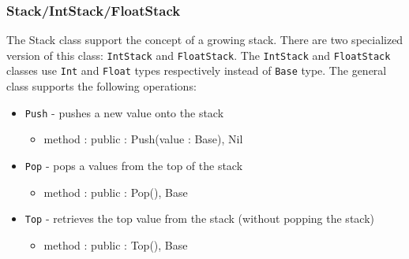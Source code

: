 \documentclass[12pt]{article}
\begin{document}
\subsubsection{Stack/IntStack/FloatStack}
The Stack class support the concept of a growing stack.  There are two specialized version of this class: \texttt{IntStack} and \texttt{FloatStack}.  The \texttt{IntStack} and \texttt{FloatStack} classes use \texttt{Int} and \texttt{Float} types respectively instead of \texttt{Base} type.  The general class supports the following operations:
\begin{itemize}
    \item \texttt{Push} - pushes a new value onto the stack
    	\begin{itemize}
	\item method : public : Push(value : Base), Nil
	\end{itemize}
    \item \texttt{Pop} - pops a values from the top of the stack
    	\begin{itemize}
	\item method : public : Pop(), Base
	\end{itemize}
    \item \texttt{Top} - retrieves the top value from the stack (without popping the stack)
    	\begin{itemize}
	\item method : public : Top(), Base
	\end{itemize}
\end{itemize}
\end{document}
